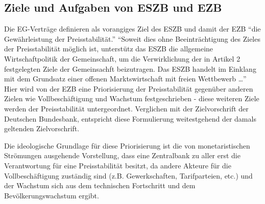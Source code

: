 \documentclass[
      onecolumn,
      a4paper,
      abstracton,
      parskip=half
      ,final
      ]{scrartcl}
\begin{document}
\subsection{Ziele und Aufgaben von ESZB und EZB}
Die EG-Verträge definieren als vorangiges Ziel des ESZB und damit der EZB "`die Gewährleistung der Preisstabilität."'
"`Soweit dies ohne Beeinträchtigung des Zieles der Preisstabilität möglich ist, unterstütz das ESZB die allgemeine Wirtschaftpolitik der Gemeinschaft, um die Verwirklichung der in Artikel 2 festgelegten Ziele der Gemeinsachft beizutragen. Das ESZB handelt im Einklang mit dem Grundsatz einer offenen Marktswirtschaft mit freien Wettbewerb \ldots"'\citep[vgl.][S.554]{Basseler2010}
Hier wird von der EZB eine Priorisierung der Preisstabilität gegenüber anderen Zielen wie Vollbeschäftigung und Wachstum festgeschrieben - diese weiteren Ziele werden der Preisstabilität untergeordnet. Verglichen mit der Zielvorschrift der Deutschen Bundesbank, entspricht diese Formulierung weitestgehend der damals geltenden Zielvorschrift.\citep[vgl.][S.554]{Basseler2010}

Die ideologische Grundlage für diese Priorisierung ist die von monetaristischen Strömungen ausgehende Vorstellung, dass eine Zentralbank zu aller erst die Verantwortung für eine Preisstabilität besitzt, da andere Akteure für die Vollbeschäftigung zuständig sind (z.B. Gewerkschaften, Tarifparteien, etc.) und der Wachstum sich aus dem technischen Fortschritt und dem Bevölkerungswachstum ergibt.
\end{document}
